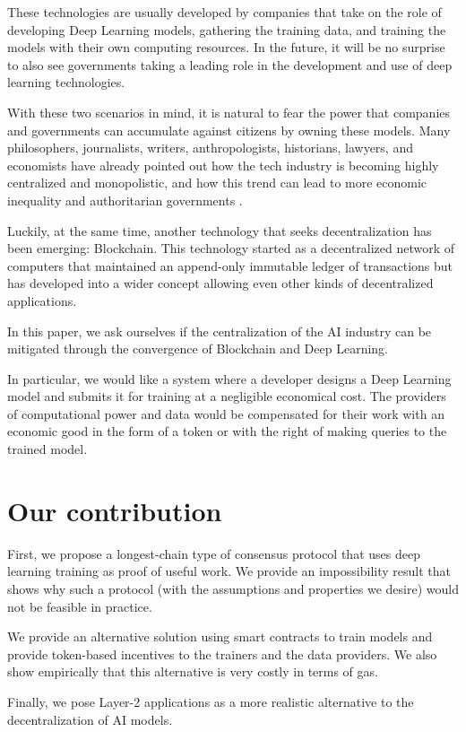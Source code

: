 \documentclass[conference]{IEEEtran}
\begin{document}
These technologies are usually developed by companies that take on the role of developing Deep Learning models, gathering the training data, and training the models with their own computing resources. In the future, it will be no surprise to also see governments taking a leading role in the development and use of deep learning technologies.

With these two scenarios in mind, it is natural to fear the power that companies and governments can accumulate against citizens by owning these models. Many philosophers, journalists, writers, anthropologists, historians, lawyers, and economists have already pointed out how the tech industry is becoming highly centralized and monopolistic, and how this trend can lead to more economic inequality and authoritarian governments \cite{b1} \cite{b2} \cite{b3} \cite{b4}.

Luckily, at the same time, another technology that seeks decentralization has been emerging: Blockchain. This technology started as a decentralized network of computers that maintained an append-only immutable ledger of transactions but has developed into a wider concept allowing even other kinds of decentralized applications.

In this paper, we ask ourselves if the centralization of the AI industry can be mitigated through the convergence of Blockchain and Deep Learning.

In particular, we would like a system where a developer designs a Deep Learning model and submits it for training at a negligible economical cost. The providers of computational power and data would be compensated for their work with an economic good in the form of a token or with the right of making queries to the trained model.

\section{Our contribution}
First, we propose a longest-chain type of consensus protocol that uses deep learning training as proof of useful work. We provide an impossibility result that shows why such a protocol (with the assumptions and properties we desire) would not be feasible in practice.

We provide an alternative solution using smart contracts to train models and provide token-based incentives to the trainers and the data providers. We also show empirically that this alternative is very costly in terms of gas.

Finally, we pose Layer-2 applications as a more realistic alternative to the decentralization of AI models.
\end{document}
